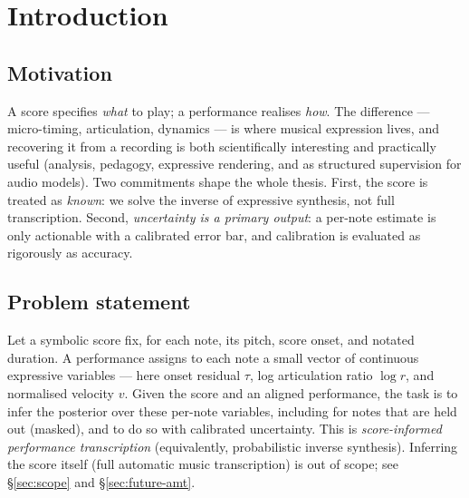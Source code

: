\documentclass[11pt,a4paper]{report}
\begin{document}
\chapter{Introduction}\label{ch:intro}

\section{Motivation}
A score specifies \emph{what} to play; a performance realises \emph{how}. The
difference --- micro-timing, articulation, dynamics --- is where musical expression
lives, and recovering it from a recording is both scientifically interesting and
practically useful (analysis, pedagogy, expressive rendering, and as structured
supervision for audio models). Two commitments shape the whole thesis. First, the
score is treated as \emph{known}: we solve the inverse of expressive synthesis, not
full transcription. Second, \emph{uncertainty is a primary output}: a per-note
estimate is only actionable with a calibrated error bar, and calibration is
evaluated as rigorously as accuracy.

\section{Problem statement}
Let a symbolic score fix, for each note, its pitch, score onset, and notated
duration. A performance assigns to each note a small vector of continuous
expressive variables --- here onset residual $\tau$, log articulation ratio
$\log r$, and normalised velocity $v$. Given the score and an aligned performance,
the task is to infer the posterior over these per-note variables, including for
notes that are held out (masked), and to do so with calibrated uncertainty. This is
\emph{score-informed performance transcription} (equivalently, probabilistic
inverse synthesis). Inferring the score itself (full automatic music transcription)
is out of scope; see \S\ref{sec:scope} and \S\ref{sec:future-amt}.
\end{document}
